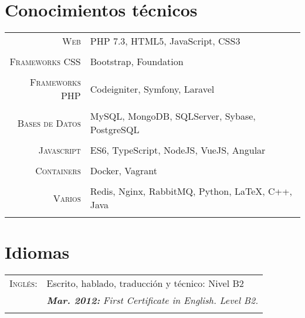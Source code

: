 \documentclass[a4paper,10pt]{article}
\begin{document}
\section{Conocimientos técnicos}
\begin{tabular}{r|p{11cm}}
	 
	\textsc{Web}& PHP 7.3, HTML5, JavaScript, CSS3 \\&\\
	\textsc{Frameworks CSS}& Bootstrap, Foundation \\&\\
	\textsc{Frameworks PHP}& Codeigniter, Symfony, Laravel \\&\\
	\textsc{Bases de Datos}& MySQL, MongoDB, SQLServer, Sybase, PostgreSQL \\&\\
	\textsc{Javascript}& ES6, TypeScript, NodeJS, VueJS, Angular \\&\\
	\textsc{Containers}& Docker, Vagrant \\&\\
	\textsc{Varios}& Redis, Nginx, RabbitMQ, Python, \LaTeX{}, C++, Java\\&\\

\end{tabular}

\section{Idiomas}
\begin{tabular}{rl}
	\textsc{Inglés:}&	Escrito, hablado, traducción y técnico: Nivel B2\\&
	\emph{\textbf{Mar. 2012:} First Certificate in English. Level B2.}\\&\\	
\end{tabular}

\end{document}
